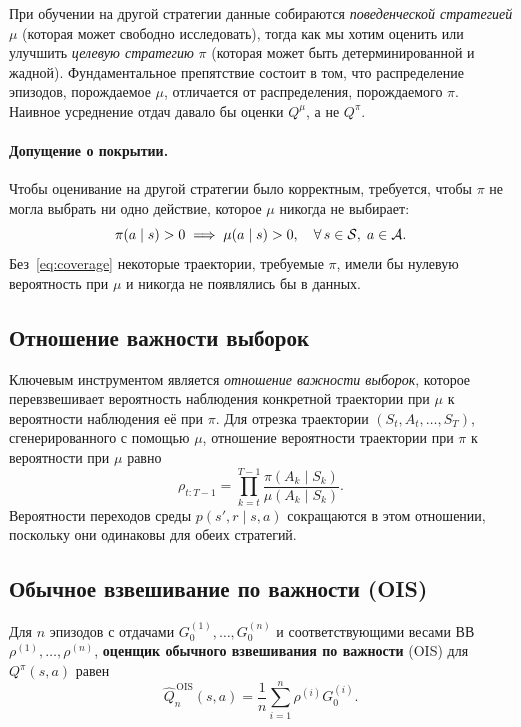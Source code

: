 При обучении на другой стратегии данные собираются \emph{поведенческой стратегией} $\mu$ (которая может свободно исследовать), тогда как мы хотим оценить или улучшить \emph{целевую стратегию} $\pi$ (которая может быть детерминированной и жадной).  Фундаментальное препятствие состоит в том, что распределение эпизодов, порождаемое $\mu$, отличается от распределения, порождаемого $\pi$.  Наивное усреднение отдач давало бы оценки $Q^\mu$, а не $Q^\pi$.

\paragraph{Допущение о покрытии.}
Чтобы оценивание на другой стратегии было корректным, требуется, чтобы $\pi$ не могла выбрать ни одно действие, которое $\mu$ никогда не выбирает:
\begin{equation}
  \label{eq:coverage}
  \pi(a \mid s) > 0 \implies \mu(a \mid s) > 0, \quad \forall\, s \in \mathcal{S},\; a \in \mathcal{A}.
\end{equation}
Без~\eqref{eq:coverage} некоторые траектории, требуемые $\pi$, имели бы нулевую вероятность при $\mu$ и никогда не появлялись бы в данных.

\subsection*{Отношение важности выборок}

Ключевым инструментом является \emph{отношение важности выборок}, которое перевзвешивает вероятность наблюдения конкретной траектории при $\mu$ к вероятности наблюдения её при $\pi$.  Для отрезка траектории $(S_t, A_t, \dots, S_T)$, сгенерированного с помощью $\mu$, отношение вероятности траектории при $\pi$ к вероятности при $\mu$ равно
\begin{equation}
  \label{eq:is-ratio}
  \rho_{t:T-1} = \prod_{k=t}^{T-1} \frac{\pi(A_k \mid S_k)}{\mu(A_k \mid S_k)}.
\end{equation}
Вероятности переходов среды $p(s', r \mid s, a)$ сокращаются в этом отношении, поскольку они одинаковы для обеих стратегий.

\subsection*{Обычное взвешивание по важности (OIS)}

\begin{definition}
\label{def:ois}
Для $n$ эпизодов с отдачами $G_0^{(1)}, \dots, G_0^{(n)}$ и соответствующими весами ВВ $\rho^{(1)}, \dots, \rho^{(n)}$, \textbf{оценщик обычного взвешивания по важности} (OIS) для $Q^\pi(s, a)$ равен
\begin{equation}
  \label{eq:ois-estimator}
  \widehat{Q}_n^{\,\mathrm{OIS}}(s, a) = \frac{1}{n} \sum_{i=1}^{n} \rho^{(i)} G_0^{(i)}.
\end{equation}
\end{definition}

